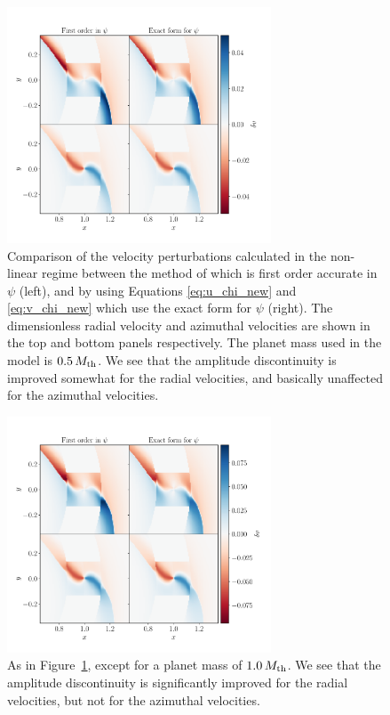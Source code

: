 \begin{figure}
    \centering
    \includegraphics[width = 0.7\textwidth]{figures/0_5_mth.pdf}
    \caption{Comparison of the velocity perturbations calculated in the non-linear regime between the method of \citet{bollati2021} which is first order accurate in $\psi$ (left), and by using Equations \eqref{eq:u_chi_new} and \eqref{eq:v_chi_new} which use the exact form for $\psi$ (right). The dimensionless radial velocity and azimuthal velocities are shown in the top and bottom panels respectively. The planet mass used in the model is $0.5 \, M_{\rm th}$. We see that the amplitude discontinuity is improved somewhat for the radial velocities, and basically unaffected for the azimuthal velocities.}
    \label{fig:0_5mth}
\end{figure}
\begin{figure}
    \centering
    \includegraphics[width = 0.7\textwidth]{figures/1_0_mth.pdf}
    \caption{As in Figure~\ref{fig:0_5mth}, except for a planet mass of $1.0 \, M_{\rm th}$. We see that the amplitude discontinuity is significantly improved for the radial velocities, but not for the azimuthal velocities.}
    \label{fig:1_0mth}
\end{figure}
